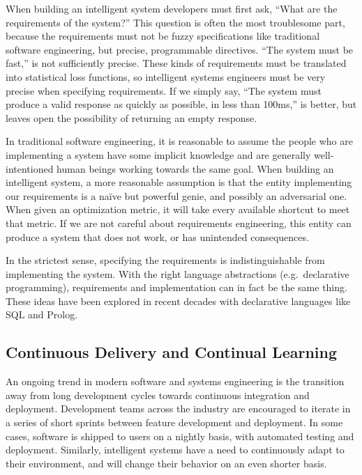 \documentclass[12pt,initial,twoside,maitrise]{dms}
\numberwithin{equation}{section}
\numberwithin{table}{chapter}
\numberwithin{figure}{chapter}
\begin{document}
When building an intelligent system developers must first ask, ``What are the requirements of the system?'' This question is often the most troublesome part, because the requirements must not be fuzzy specifications like traditional software engineering, but precise, programmable directives. ``The system must be fast,'' is not sufficiently precise. These kinds of requirements must be translated into statistical loss functions, so intelligent systems engineers must be very precise when specifying requirements. If we simply say, ``The system must produce a valid response as quickly as possible, in less than 100ms,'' is better, but leaves open the possibility of returning an empty response.

In traditional software engineering, it is reasonable to assume the people who are implementing a system have some implicit knowledge and are generally well-intentioned human beings working towards the same goal. When building an intelligent system, a more reasonable assumption is that the entity implementing our requirements is a na\"ive but powerful genie, and possibly an adversarial one. When given an optimization metric, it will take every available shortcut to meet that metric. If we are not careful about requirements engineering, this entity can produce a system that does not work, or has unintended consequences.

In the strictest sense, specifying the requirements is indistinguishable from implementing the system. With the right language abstractions (e.g.\ declarative programming), requirements and implementation can in fact be the same thing. These ideas have been explored in recent decades with declarative languages like SQL and Prolog.

\subsection{Continuous Delivery and Continual Learning}

An ongoing trend in modern software and systems engineering is the transition away from long development cycles towards continuous integration and deployment. Development teams across the industry are encouraged to iterate in a series of short sprints between feature development and deployment. In some cases, software is shipped to users on a nightly basis, with automated testing and deployment. Similarly, intelligent systems have a need to continuously adapt to their environment, and will change their behavior on an even shorter basis.
\end{document}
